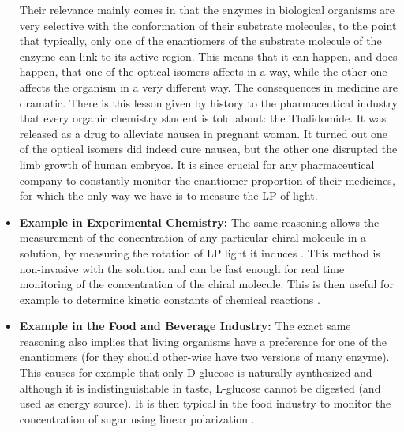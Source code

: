 \documentclass[11pt, a4paper, twoside]{article} %
\begin{document}
\begin{itemize}
Their relevance mainly comes in that the enzymes in biological organisms are very selective with the conformation of their substrate molecules, to the point that typically, only one of the enantiomers of the substrate molecule of the enzyme can link to its active region. This means that it can happen, and does happen, that one of the optical isomers affects in a way, while the other one affects the organism in a very different way. The consequences in medicine are dramatic. There is this lesson given by history to the pharmaceutical industry that every organic chemistry student is told about: the Thalidomide. It was released as a drug to alleviate nausea in pregnant woman. It turned out one of the optical isomers did indeed cure nausea, but the other one disrupted the limb growth of human embryos. It is since crucial for any pharmaceutical company to constantly monitor the enantiomer proportion of their medicines, for which the only way we have is to measure the LP of light. 


\item {\bf Example in Experimental Chemistry: }The same reasoning allows the measurement of the concentration of any particular chiral molecule in a solution, by measuring the rotation of LP light it induces \cite{concentration1, concentration2}. This method is non-invasive with the solution and can be fast enough for real time monitoring of the concentration of the chiral molecule. This is then useful for example to determine kinetic constants of chemical reactions \cite{enantiomers}.

\item {\bf Example in the Food and Beverage Industry:} The exact same reasoning also implies that living organisms have a preference for one of the enantiomers (for they should other-wise have two versions of many enzyme). This causes for example that only D-glucose is naturally synthesized and although it is indistinguishable in taste, L-glucose cannot be digested (and used as energy source). It is then typical in the food industry to monitor the concentration of sugar using linear polarization \cite{manual}.


\end{itemize}
\end{document}
